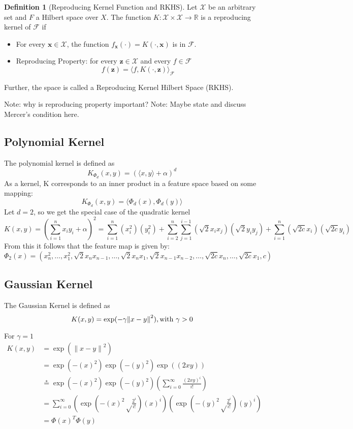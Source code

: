 \documentclass[12pt]{article}
\theoremstyle{definition}
\newtheorem{definition}{Definition}[section]
\theoremstyle{remark}
\begin{document}
\begin{definition}[Reproducing Kernel Function and RKHS]
  Let \(\mathcal{X}\) be an arbitrary set and \(F\) a Hilbert space over \(X\). The function \(K: \mathcal{X} \times \mathcal{X} \rightarrow \mathbb{R}\) is a reproducing kernel of \(\mathcal{F}\) if
  \begin{itemize}
    \item For every \(\mathbf{x} \in \mathcal{X}\), the function \(f_{\mathbf{x}}(\cdot) = K(\cdot, \mathbf{x})\) is in \(\mathcal{F}\).
    \item Reproducing Property: for every \(\mathbf{z} \in \mathcal{X}\) and every \(f \in \mathcal{F}\)
      \[
        f(\mathbf{z}) = {\langle f, K(\cdot, \mathbf{z}) \rangle}_{\mathcal{F}}
      \]
  \end{itemize}
  Further, the space is called a Reproducing Kernel Hilbert Space (RKHS).
\end{definition}

Note: why is reproducing property important?
Note: Maybe state and discuss Mercer's condition here.

\subsection{Polynomial Kernel}
The polynomial kernel is defined as
\[
  K_{\Phi_{d}}(x, y) = {(\langle x,y \rangle + \alpha)}^{d}
\]
As a kernel, K corresponds to an inner product in a feature space based on some mapping:
\[
  K_{\Phi_{d}}(x, y) = \langle \Phi_{d}(x), \Phi_{d}(y) \rangle
\]
Let \( d=2 \), so we get the special case of the quadratic kernel
\[
  K(x, y) = (\sum_{i=1}^{n} x_{i}y_{i} + \alpha)^{2} = \sum_{i=1}^{n}(x_{i}^{2})(y_{i}^{2}) + \sum_{i=2}^{n}\sum_{j=1}^{i-1}(\sqrt{2}x_{i}x_{j})(\sqrt{2}y_{i}y_{j}) + \sum_{i=1}^{n}(\sqrt{2c}x_{i})(\sqrt{2c}y_{i})
\]
From this it follows that the feature map is given by:
\[
  \Phi_{2}(x) = (x_{n}^{2},\dots,x_{1}^{2},\sqrt{2}x_{n}x_{n-1},\dots,\sqrt{2}x_{n}x_{1},\sqrt{2}x_{n-1}x_{n-2},\dots,\sqrt{2c}x_{n},\dots,\sqrt{2c}x_{1},c)
\]


\subsection{Gaussian Kernel}
The Gaussian Kernel is defined as
\[
  K(x, y) = \exp(-\gamma{\| x-y \|}^{2}), \text{with \( \gamma > 0\)}
\]

For \(\gamma = 1\)
\begin{equation}
  \begin{split}
      K(x, y) &= \exp({\| x-y \|}^{2}) \\
              &= \exp(-{(x)}^{2})\exp(-{(y)}^{2})\exp({(2xy)}) \\
              &\stackrel{*}{=} \exp(-{(x)}^{2})\exp(-{(y)}^{2})(\sum_{i=0}^{\infty}\frac{{(2xy)}^{i}}{i!}) \\
              &= \sum_{i=0}^{\infty}(\exp(-{(x)}^{2}\sqrt\frac{2^{i}}{i!}){(x)}^{i})(\exp(-{(y)}^{2}\sqrt\frac{2^{i}}{i!}){(y)}^{i}) \\
              &= \Phi{(x)}^{T}\Phi(y)\\
  \end{split}
\end{equation}
\end{document}
